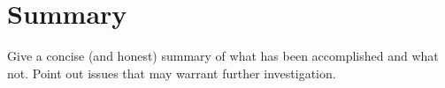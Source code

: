 \documentclass[english,notitlepage,smartquotes]{hgbreport}
\begin{document}
\chapter{Summary}

Give a concise (and honest) summary of what has been accomplished and what not. 
Point out issues that may warrant further investigation.

\appendix                                                   %


\MakeBibliography[nosplit]

\end{document}
